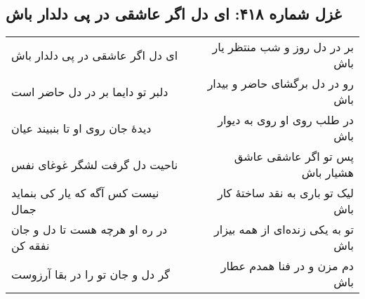 \begin{center}
\section*{غزل شماره ۴۱۸: ای دل اگر عاشقی در پی دلدار باش}
\label{sec:418}
\begin{longtable}{l p{0.5cm} r}
ای دل اگر عاشقی در پی دلدار باش
&&
بر در دل روز و شب منتظر یار باش
\\
دلبر تو دایما بر در دل حاضر است
&&
رو در دل برگشای حاضر و بیدار باش
\\
دیدهٔ جان روی او تا بنبیند عیان
&&
در طلب روی او روی به دیوار باش
\\
ناحیت دل گرفت لشگر غوغای نفس
&&
پس تو اگر عاشقی عاشق هشیار باش
\\
نیست کس آگه که یار کی بنماید جمال
&&
لیک تو باری به نقد ساختهٔ کار باش
\\
در ره او هرچه هست تا دل و جان نفقه کن
&&
تو به یکی زنده‌ای از همه بیزار باش
\\
گر دل و جان تو را در بقا آرزوست
&&
دم مزن و در فنا همدم عطار باش
\\
\end{longtable}
\end{center}

